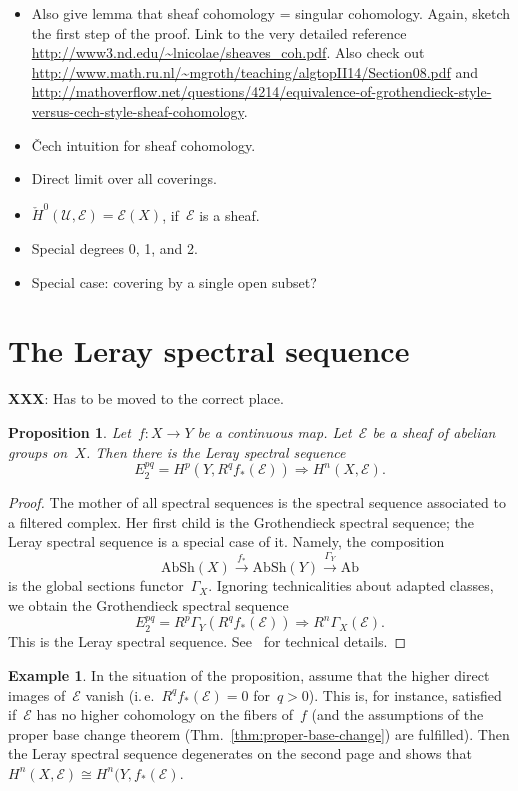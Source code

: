 \documentclass[10pt]{amsart}
\makeatletter
\theoremstyle{definition}
\newtheorem{ex}[defn]{Example}
\theoremstyle{plain}
\newtheorem{prop}[defn]{Proposition}
\theoremstyle{remark}
\newcommand{\E}{\mathcal{E}}
\newcommand{\U}{\mathcal{U}}
\newcommand{\Ab}{\mathrm{Ab}}
\newcommand{\AbSh}{\mathrm{AbSh}}
\newcommand{\ie}{i.\,e.\@\xspace}
\newcommand{\stackhref}[1]{\href{http://stacks.math.columbia.edu/tag/#1}{#1}}
\makeatother
\begin{document}
\begin{itemize}
\item Also give lemma that sheaf cohomology = singular cohomology. Again,
sketch the first step of the proof. Link to the very detailed reference
\url{http://www3.nd.edu/~lnicolae/sheaves_coh.pdf}. Also check out
\url{http://www.math.ru.nl/~mgroth/teaching/algtopII14/Section08.pdf} and
\url{http://mathoverflow.net/questions/4214/equivalence-of-grothendieck-style-versus-cech-style-sheaf-cohomology}.
\item Čech intuition for sheaf cohomology.
\item Direct limit over all coverings.
\item $\check H^0(\U,\E) = \E(X)$, if~$\E$ is a sheaf.
\item Special degrees 0, 1, and 2.
\item Special case: covering by a single open subset?
\end{itemize}



\section{The Leray spectral sequence}

\textbf{XXX}: Has to be moved to the correct place.

\begin{prop}Let~$f : X \to Y$ be a continuous map. Let~$\E$ be a sheaf of
abelian groups on~$X$. Then there is the \emph{Leray spectral sequence}
\[ E_2^{pq} = H^p(Y, R^q f_*(\E)) \Longrightarrow H^n(X, \E). \]
\end{prop}

\begin{proof}The mother of all spectral sequences is the spectral sequence
associated to a filtered complex. Her first child is the Grothendieck spectral
sequence; the Leray spectral sequence is a special case of it. Namely, the
composition
\[ \AbSh(X) \xrightarrow{f_*} \AbSh(Y) \xrightarrow{\Gamma_Y} \Ab \]
is the global sections functor~$\Gamma_X$. Ignoring technicalities about
adapted classes, we obtain the Grothendieck spectral sequence
\[ E_2^{pq} = R^p\Gamma_Y(R^q f_*(\E)) \Longrightarrow R^n\Gamma_X(\E). \]
This is the Leray spectral sequence.
See~\cite[Tag~\stackhref{0732}]{stacks-project} for technical details.
\end{proof}

\begin{ex}In the situation of the proposition, assume that the higher direct
images of~$\E$ vanish (\ie~$R^q f_*(\E) = 0$ for~$q > 0$). This is, for
instance, satisfied if~$\E$ has no higher cohomology on the fibers of~$f$ (and
the assumptions of the proper base change theorem
(Thm.~\ref{thm:proper-base-change}) are fulfilled). Then the Leray spectral
sequence degenerates on the second page and shows that~$H^n(X,\E) \cong
H^n(Y,f_*(\E)$.
\end{ex}
\end{document}
